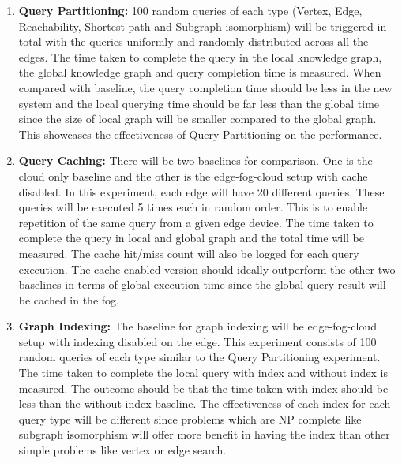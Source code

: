 \documentclass[conference]{IEEEtran}
\begin{document}
\begin{enumerate}%
	\item \textbf{Query Partitioning:} 100 random queries of each type (Vertex, Edge, Reachability, Shortest path and Subgraph isomorphism) will be triggered in total with the queries uniformly and randomly distributed across all the edges. The time taken to complete the query in the local knowledge graph, the global knowledge graph and query completion time is measured. When compared with baseline, the query completion time should be less in the new system and the local querying time should be far less than the global time since the size of local graph will be smaller compared to the global graph. This showcases the effectiveness of Query Partitioning on the performance.
    \item \textbf{Query Caching:} There will be two baselines for comparison. One is the cloud only baseline and the other is the edge-fog-cloud setup with cache disabled. In this experiment, each edge will have 20 different queries. These queries will be executed 5 times each in random order. This is to enable repetition of the same query from a given edge device. The time taken to complete the query in local and global graph and the total time will be measured. The cache hit/miss count will also be logged for each query execution. The cache enabled version should ideally outperform the other two baselines in terms of global execution time since the global query result will be cached in the fog.
    \item \textbf{Graph Indexing:} The baseline for graph indexing will be edge-fog-cloud setup with indexing disabled on the edge. This experiment consists of 100 random queries of each type similar to the Query Partitioning experiment. The time taken to complete the local query with index and without index is measured. The outcome should be that the time taken with index should be less than the without index baseline. The effectiveness of each index for each query type will be different since problems which are NP complete like subgraph isomorphism will offer more benefit in having the index than other simple problems like vertex or edge search.
\end{enumerate}







\end{document}
